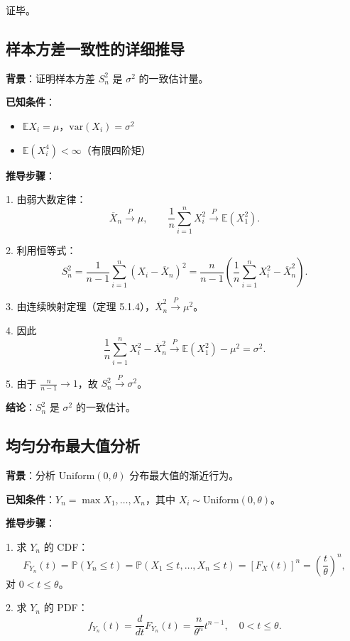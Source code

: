 证毕。

\subsection{样本方差一致性的详细推导}\label{sec:sample-variance-consistency}

\textbf{背景}：证明样本方差 $S_n^2$ 是 $\sigma^2$ 的一致估计量。

\textbf{已知条件}：
\begin{itemize}
\item $\mathbb{E}X_i = \mu$，$\text{var}(X_i) = \sigma^2$
\item $\mathbb{E}(X_i^4) < \infty$（有限四阶矩）
\end{itemize}

\textbf{推导步骤}：

1. 由弱大数定律：
\[
\overline{X}_n \xrightarrow{P} \mu,\qquad \frac{1}{n}\sum_{i=1}^n X_i^2 \xrightarrow{P} \mathbb{E}(X_1^2).
\]

2. 利用恒等式：
\[
S_n^2 = \frac{1}{n-1}\sum_{i=1}^n (X_i - \overline{X}_n)^2 = \frac{n}{n-1}\left(\frac{1}{n}\sum_{i=1}^n X_i^2 - \overline{X}_n^2\right).
\]

3. 由连续映射定理（定理 5.1.4），$\overline{X}_n^2 \xrightarrow{P} \mu^2$。

4. 因此
\[
\frac{1}{n}\sum_{i=1}^n X_i^2 - \overline{X}_n^2 \xrightarrow{P} \mathbb{E}(X_1^2) - \mu^2 = \sigma^2.
\]

5. 由于 $\frac{n}{n-1} \to 1$，故 $S_n^2 \xrightarrow{P} \sigma^2$。

\textbf{结论}：$S_n^2$ 是 $\sigma^2$ 的一致估计。

\subsection{均匀分布最大值分析}\label{sec:uniform-max-derivation}

\textbf{背景}：分析 $\mathrm{Uniform}(0, \theta)$ 分布最大值的渐近行为。

\textbf{已知条件}：$Y_n = \max{X_1, \ldots, X_n}$，其中 $X_i \sim \mathrm{Uniform}(0, \theta)$。

\textbf{推导步骤}：

1. 求 $Y_n$ 的 CDF：
\[
F_{Y_n}(t) = \mathbb{P}(Y_n \leq t) = \mathbb{P}(X_1 \leq t, \ldots, X_n \leq t) = [F_X(t)]^n = \left(\frac{t}{\theta}\right)^n,
\]
对 $0 < t \leq \theta$。

2. 求 $Y_n$ 的 PDF：
\[
f_{Y_n}(t) = \frac{d}{dt}F_{Y_n}(t) = \frac{n}{\theta^n}t^{n-1},\quad 0 < t \leq \theta.
\]


